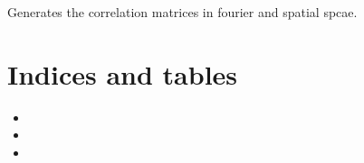 \documentclass[letterpaper,10pt,english]{sphinxmanual}
\begin{document}
\begin{fulllineitems}
\begin{fulllineitems}
\end{fulllineitems}


\begin{fulllineitems}
\label{\detokenize{gaussClass:gaussClass.GaussianRandomField.gen_correlation}}
\sphinxAtStartPar
Generates the correlation matrices in fourier and spatial spcae.

\end{fulllineitems}


\end{fulllineitems}



\chapter{Indices and tables}
\label{\detokenize{index:indices-and-tables}}\begin{itemize}
\item {} 
\sphinxAtStartPar
{}

\item {} 
\sphinxAtStartPar
{}

\item {} 
\sphinxAtStartPar
{}

\end{itemize}


\renewcommand{\indexname}{Python Module Index}
\begin{sphinxtheindex}
\let\bigletter\sphinxstyleindexlettergroup
\bigletter{g}
\item\relax{}
\indexspace
\bigletter{t}
\item\relax{}
\indexspace
\bigletter{u}
\item\relax{}
\end{sphinxtheindex}

\renewcommand{\indexname}{Index}
\printindex
\end{document}
